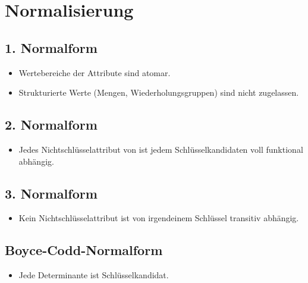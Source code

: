 \section{Normalisierung}
\begin{multicols}{2}
    \subsection{1. Normalform}
    \begin{itemize}
    \setlength{\itemsep}{0pt}  
      \item Wertebereiche der Attribute sind atomar.
      \item Strukturierte Werte (Mengen, Wiederholungsgruppen) sind nicht zugelassen.
    \end{itemize}
    
    \subsection{2. Normalform}
    \begin{itemize}
    \setlength{\itemsep}{0pt}
      \item Jedes Nichtschlüsselattribut von ist jedem Schlüsselkandidaten voll funktional abhängig.
    \end{itemize}
    
    \subsection{3. Normalform}
    \begin{itemize}
    \setlength{\itemsep}{0pt}
      \item Kein Nichtschlüsselattribut ist von irgendeinem Schlüssel transitiv abhängig.
    \end{itemize}
    
    \subsection{Boyce-Codd-Normalform}
    \begin{itemize}
    \setlength{\itemsep}{0pt}
      \item Jede Determinante ist Schlüsselkandidat.
    \end{itemize}
\end{multicols}